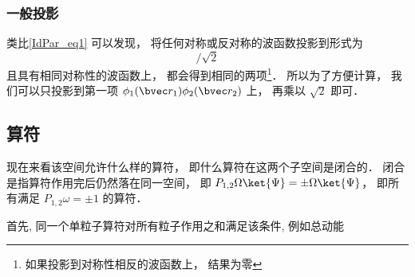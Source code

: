 \subsubsection{一般投影}
类比\autoref{IdPar_eq1} 可以发现， 将任何对称或反对称的波函数投影到形式为
\begin{equation}
[\phi_1(\bvec r_1)\phi_2(\bvec r_2) \pm \phi_2(\bvec r_1)\phi_1(\bvec r_2)]/\sqrt{2}
\end{equation}
且具有相同对称性的波函数上， 都会得到相同的两项\footnote{如果投影到对称性相反的波函数上， 结果为零}． 所以为了方便计算， 我们可以只投影到第一项 $\phi_1(\bvec r_1)\phi_2(\bvec r_2)$ 上， 再乘以 $\sqrt{2}$ 即可．

\subsection{算符}
现在来看该空间允许什么样的算符， 即什么算符在这两个子空间是闭合的． 闭合是指算符作用完后仍然落在同一空间， 即 $P_{1,2}\Omega\ket{\Psi} = \pm \Omega \ket{\Psi}$， 即所有满足 $P_{1,2}\omega = \pm 1$ 的算符．

首先, 同一个单粒子算符对所有粒子作用之和满足该条件, 例如总动能
